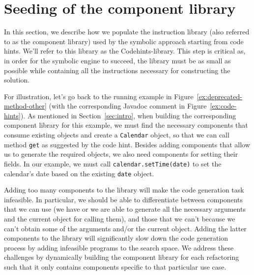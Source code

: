 \documentclass[sigconf,review,anonymous]{acmart}
\begin{document}
  


\section{Seeding of the component library} \label{sec:components-seeding}

In this section, we describe how we populate the instruction library (also referred to as the component library)
used by the symbolic approach starting from code hints. We'll refer to this library as the Codehints-library.
This step is critical as, in order for the symbolic engine to succeed, the library must be as small as possible
while containing all the instructions necessary
for constructing the solution.

For illustration, let's go back to the running example in Figure~\ref{ex:deprecated-method-other} (with the corresponding Javadoc comment in Figure~\ref{ex:code-hints}).
%
As mentioned in Section~\ref{sec:intro}, when building the corresponding component library for this example, 
%
we must find the necessary
components that consume existing objects and create a \texttt{Calendar} object, so that we can call method \texttt{get} as suggested by the code hint.
Besides adding components that allow us to generate the required objects, we also need components for setting their
fields. In our example, we must call
\texttt{calendar.setTime(date)} to set the calendar's date
based on the existing \texttt{date} object.

Adding too many components to the library will
make the code generation task infeasible. In particular, we should
be able to differentiate between components that we can use
(we have or we are able to generate
all the necessary arguments and the current object for calling them), and those
that we can't because we can't obtain some of the arguments
and/or the current object. Adding the latter components to the library will
significantly slow down the code generation process by
adding infeasible programs to the search space.
We address these challenges by dynamically building the component library for each refactoring
such that it only contains components specific to that particular use case.
\end{document}
